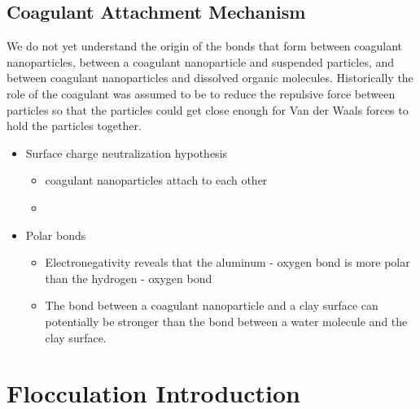 \documentclass[letterpaper,10pt,english]{sphinxmanual}
\begin{document}
\section{Coagulant Attachment Mechanism}
\label{\detokenize{Rapid_Mix/RM_Theory_and_Future_Work:coagulant-attachment-mechanism}}\label{\detokenize{Rapid_Mix/RM_Theory_and_Future_Work:heading-coagulant-attachment-mechanism}}
We do not yet understand the origin of the bonds that form between coagulant nanoparticles, between a coagulant nanoparticle and suspended particles, and between coagulant nanoparticles and dissolved organic molecules. Historically the role of the coagulant was assumed to be to reduce the repulsive force between particles so that the particles could get close enough for Van der Waals forces to hold the particles together.
\begin{itemize}
\item {} 
Surface charge neutralization hypothesis
\begin{itemize}
\item {} 
coagulant nanoparticles attach to each other

\item {} 
\end{itemize}

\item {} 
Polar bonds
\begin{itemize}
\item {} 
Electronegativity reveals that the aluminum - oxygen bond is more polar than the hydrogen - oxygen bond

\item {} 
The bond between a coagulant nanoparticle and a clay surface can potentially be stronger than the bond between a water molecule and the clay surface.

\end{itemize}

\end{itemize}
\label{\detokenize{Rapid_Mix/RM_Theory_and_Future_Work:heading-conventional-mechanical-rapid-mix}}

\chapter{Flocculation  Introduction}
\label{\detokenize{Flocculation/Floc_Intro:flocculation-introduction}}\label{\detokenize{Flocculation/Floc_Intro:title-flocculation-introduction}}\label{\detokenize{Flocculation/Floc_Intro::doc}}
\end{document}
